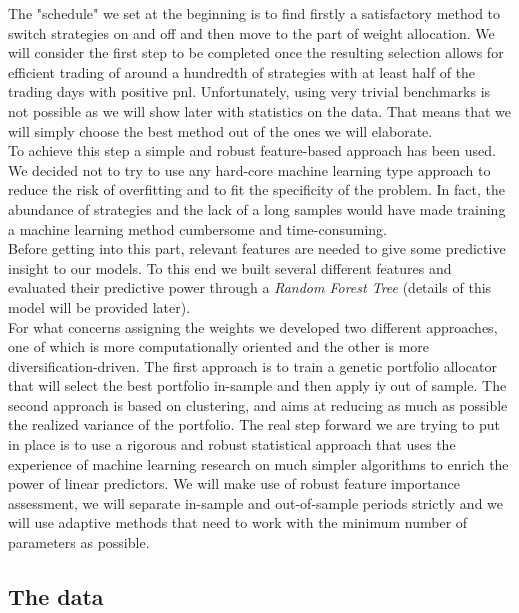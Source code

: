 \documentclass[12pt]{article} %
\numberwithin{equation}{subsection}
\begin{document}
The "schedule" we set at the beginning is to find firstly a satisfactory method to switch strategies on and off and then move to the part of weight allocation. We will consider the first step to be completed once the resulting selection allows for efficient trading of around a hundredth of strategies with at least half of the trading days with positive pnl. Unfortunately, using very trivial benchmarks is not possible as we will show later with statistics on the data. That means that we will simply choose the best method out of the ones we will elaborate.\\
To achieve this step a simple and robust feature-based approach has been used. We decided not to try to use any hard-core machine learning type approach to reduce the risk of overfitting and to fit the specificity of the problem. In fact, the abundance of strategies and the lack of a long samples would have made training a machine learning method cumbersome and time-consuming.\\
Before getting into this part, relevant features are needed to give some predictive insight to our models. To this end we built several different features and evaluated their predictive power through a \textit{Random Forest Tree} (details of this model will be provided later).\\
For what concerns assigning the weights we developed two different approaches, one of which is more computationally oriented and the other is more diversification-driven. The first approach is to train a genetic portfolio allocator that will select the best portfolio in-sample and then apply iy out of sample. The second approach is based on clustering, and aims at reducing as much as possible the realized variance of the portfolio. The real step forward we are trying to put in place is to use a rigorous and robust statistical approach that uses the experience of machine learning research on much simpler algorithms to enrich the power of linear predictors. We will make use of robust feature importance assessment, we will separate in-sample and out-of-sample periods strictly and we will use adaptive methods that need to work with the minimum number of parameters as possible.\\


\subsection{The data}
\end{document}
